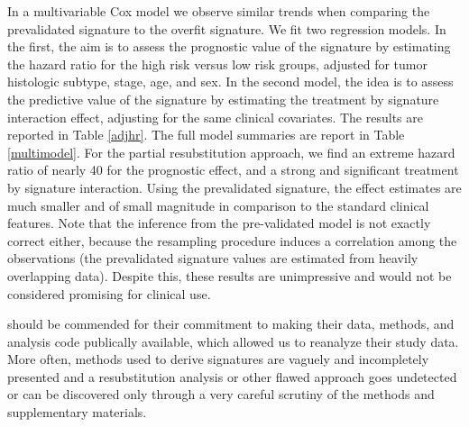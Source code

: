 \documentclass[11pt,]{article}
\begin{document}
In a multivariable Cox model we observe similar trends when comparing
the prevalidated signature to the overfit signature. We fit two
regression models. In the first, the aim is to assess the prognostic
value of the signature by estimating the hazard ratio for the high risk
versus low risk groups, adjusted for tumor histologic subtype, stage,
age, and sex. In the second model, the idea is to assess the predictive
value of the signature by estimating the treatment by signature
interaction effect, adjusting for the same clinical covariates. The
results are reported in Table \ref{adjhr}. The full model summaries are
report in Table \ref{multimodel}. For the partial resubstitution
approach, we find an extreme hazard ratio of nearly 40 for the
prognostic effect, and a strong and significant treatment by signature
interaction. Using the prevalidated signature, the effect estimates are
much smaller and of small magnitude in comparison to the standard
clinical features. Note that the inference from the pre-validated model
is not exactly correct either, because the resampling procedure induces
a correlation among the observations (the prevalidated signature values
are estimated from heavily overlapping data). Despite this, these
results are unimpressive and would not be considered promising for
clinical use.

\citet{zhu2010prognostic} should be commended for their commitment to
making their data, methods, and analysis code publically available,
which allowed us to reanalyze their study data. More often, methods used
to derive signatures are vaguely and incompletely presented and a
resubstitution analysis or other flawed approach goes undetected or can
be discovered only through a very careful scrutiny of the methods and
supplementary materials.
\end{document}
